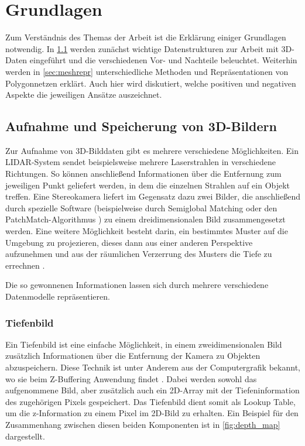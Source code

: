 
\chapter{Grundlagen}
\label{ch:grundlagen}

Zum Verständnis des Themas der Arbeit ist die Erklärung einiger Grundlagen notwendig.
In \ref{sec:3d-bilder} werden zunächst wichtige Datenstrukturen zur Arbeit mit 3D-Daten eingeführt und die verschiedenen Vor- und Nachteile beleuchtet.
Weiterhin werden in \ref{sec:meshrepr} unterschiedliche Methoden und Repräsentationen von Polygonnetzen erklärt.
Auch hier wird diskutiert, welche positiven und negativen Aspekte die jeweiligen Ansätze auszeichnet.


\section{Aufnahme und Speicherung von 3D-Bildern}
\label{sec:3d-bilder}

Zur Aufnahme von 3D-Bilddaten gibt es mehrere verschiedene Möglichkeiten.
Ein LIDAR-System sendet beispielsweise mehrere Laserstrahlen in verschiedene Richtungen.
So können anschließend Informationen über die Entfernung zum jeweiligen Punkt geliefert werden, in dem die einzelnen Strahlen auf ein Objekt treffen.
Eine Stereokamera liefert im Gegensatz dazu zwei Bilder, die anschließend durch spezielle Software (beispielweise durch Semiglobal Matching \cite{hirschmuller2007stereo} oder den PatchMatch-Algorithmus \cite{barnes2009patchmatch}) zu einem dreidimensionalen Bild zusammengesetzt werden.
Eine weitere Möglichkeit besteht darin, ein bestimmtes Muster auf die Umgebung zu projezieren, dieses dann aus einer anderen Perspektive aufzunehmen und aus der räumlichen Verzerrung des Musters die Tiefe zu errechnen \cite{geng2011structured}.

Die so gewonnenen Informationen lassen sich durch mehrere verschiedene Datenmodelle repräsentieren.


\subsection{Tiefenbild}
\label{subsec:tiefenbild}

Ein Tiefenbild ist eine einfache Möglichkeit, in einem zweidimensionalen Bild zusätzlich Informationen über die Entfernung der Kamera zu Objekten abzuspeichern.
Diese Technik ist unter Anderem aus der Computergrafik bekannt, wo sie beim Z-Buffering Anwendung findet \cite[32]{catmull1974subdivision}.
Dabei werden sowohl das aufgenommene Bild, aber zusätzlich auch ein 2D-Array mit der Tiefeninformation des zugehörigen Pixels gespeichert.
Das Tiefenbild dient somit als Lookup Table, um die z-Information zu einem Pixel im 2D-Bild zu erhalten.
Ein Beispiel für den Zusammenhang zwischen diesen beiden Komponenten ist in \autoref{fig:depth_map} dargestellt.

